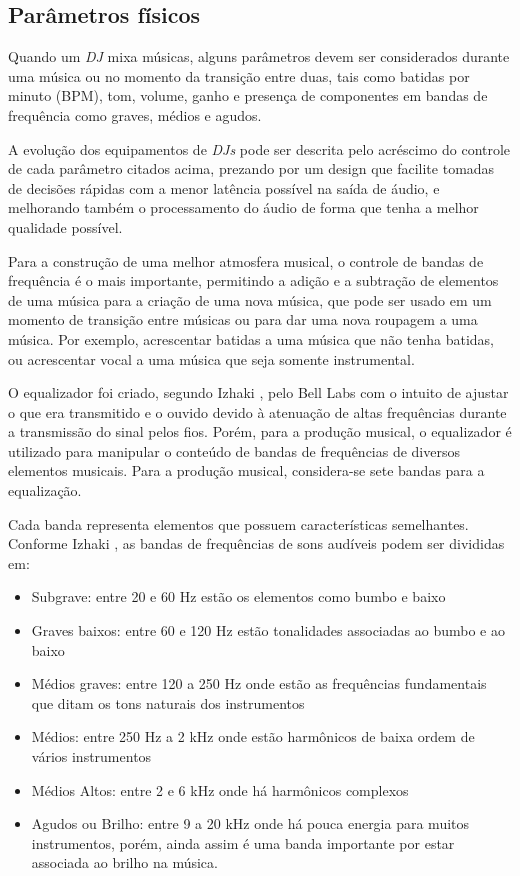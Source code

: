 \newpage
\subsection{Parâmetros físicos}
Quando um \textit{DJ} mixa músicas, alguns parâmetros devem ser considerados durante uma música ou no momento da transição entre duas, tais como batidas por minuto (BPM), tom, volume, ganho e presença de componentes em bandas de frequência como graves, médios e agudos.
\par
A evolução dos equipamentos de \textit{DJs} pode ser descrita pelo acréscimo do controle de cada parâmetro citados acima, prezando por um design que facilite tomadas de decisões rápidas com a menor latência possível na saída de áudio, e melhorando também o processamento do áudio de forma que tenha a melhor qualidade possível.
\par
Para a construção de uma melhor atmosfera musical, o controle de bandas de frequência é o mais importante, permitindo a adição e a subtração de elementos de uma música para a criação de uma nova música, que pode ser usado em um momento de transição entre músicas ou para dar uma nova roupagem a uma música. Por exemplo, acrescentar batidas a uma música que não tenha batidas, ou acrescentar vocal a uma música que seja somente instrumental.
\par
O equalizador foi criado, segundo Izhaki \cite{mixing}, pelo Bell Labs com o intuito de ajustar o que era transmitido e o ouvido devido à atenuação de altas frequências durante a transmissão do sinal pelos fios. Porém, para a produção musical, o equalizador é utilizado para manipular o conteúdo de bandas de frequências de diversos elementos musicais. 
Para a produção musical, considera-se sete bandas para a equalização.
\par 
Cada banda representa elementos que possuem características semelhantes. Conforme Izhaki \cite{mixing}, as bandas de frequências de sons audíveis podem ser divididas em:


\begin{itemize}
	\item Subgrave: entre 20 e 60 Hz estão os elementos como bumbo e baixo
	\item Graves baixos: entre 60 e 120 Hz estão tonalidades associadas ao bumbo e ao baixo
	\item Médios graves: entre 120 a 250 Hz onde estão as frequências fundamentais que ditam os tons naturais dos instrumentos
	\item Médios: entre 250 Hz a 2 kHz onde estão harmônicos de baixa ordem de vários instrumentos
	\item Médios Altos: entre 2 e 6 kHz onde há harmônicos complexos
	\item Agudos ou Brilho: entre 9 a 20 kHz onde há pouca energia para muitos instrumentos, porém, ainda assim é uma banda importante por estar associada ao brilho na música.
\end{itemize}

